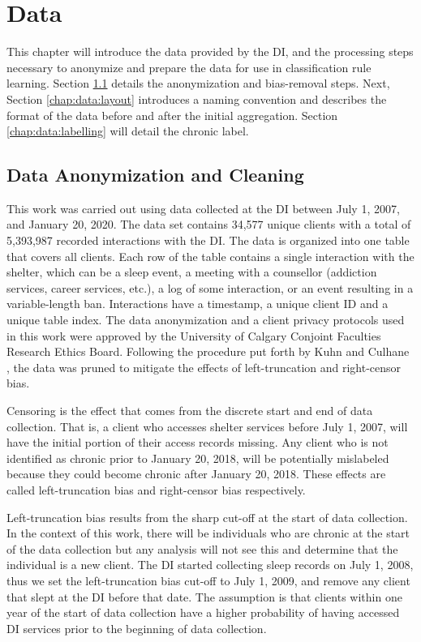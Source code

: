 \chapter {Data} \label{chap:data}


This chapter will introduce the data provided by the DI, and the processing steps necessary to anonymize and prepare the data for use in classification rule learning.
Section \ref{chap:data:cleaning} details the anonymization and bias-removal steps.
Next, Section \ref{chap:data:layout} introduces a naming convention and describes the format of the data before and after the initial aggregation. Section \ref{chap:data:labelling} will detail the chronic label.

\section{Data Anonymization and Cleaning} \label{chap:data:cleaning}

This work was carried out using data collected at the DI between July 1, 2007, and January 20, 2020. The data set contains 34,577 unique clients with a total of 5,393,987 recorded interactions with the DI. The data is organized into one table that covers all clients. Each row of the table contains a single interaction with the shelter, which can be a sleep event, a meeting with a counsellor (addiction services, career services, etc.), a log of some interaction, or an event resulting in a variable-length ban. Interactions have a timestamp, a unique client ID and a unique table index.
The data anonymization and a client privacy protocols used in this work were approved by the University of Calgary Conjoint Faculties Research Ethics Board. 
Following the procedure put forth by Kuhn and Culhane \cite{kuhn1998applying}, the data was pruned to mitigate the effects of left-truncation and right-censor bias.

Censoring is the effect that comes from the discrete start and end of data collection.  That is, a client who accesses shelter services before July 1, 2007, will have the initial portion of their access records missing. Any client who is not identified as chronic prior to January 20, 2018, will be potentially mislabeled because they could become chronic after January 20, 2018. These effects are called left-truncation bias and right-censor bias respectively.

Left-truncation bias results from the sharp cut-off at the start of data collection.
In the context of this work, there will be individuals who are chronic at the start of the data collection but any analysis will not see this and determine that the individual is a new client. The DI started collecting sleep records on July 1, 2008, thus we set the left-truncation bias cut-off to July 1, 2009, and remove any client that slept at the DI before that date. The assumption is that clients within one year of the start of data collection have a higher probability of having accessed DI services prior to the beginning of data collection.

